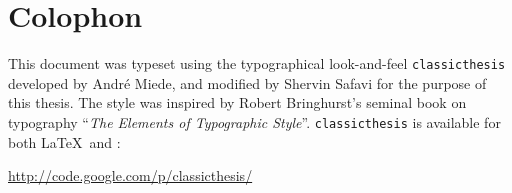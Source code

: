 
\pagestyle{empty}

\hfill

\vfill


\section*{Colophon}

This document was typeset using the typographical look-and-feel \texttt{classicthesis} developed by Andr\'e Miede, and modified by Shervin Safavi for the purpose of this thesis. The style was inspired by Robert Bringhurst's seminal book on typography ``\emph{The Elements of Typographic Style}''. \texttt{classicthesis} is available for both \LaTeX\ and \mLyX: 

\begin{center}
\url{http://code.google.com/p/classicthesis/}
\end{center}

 
\bigskip

